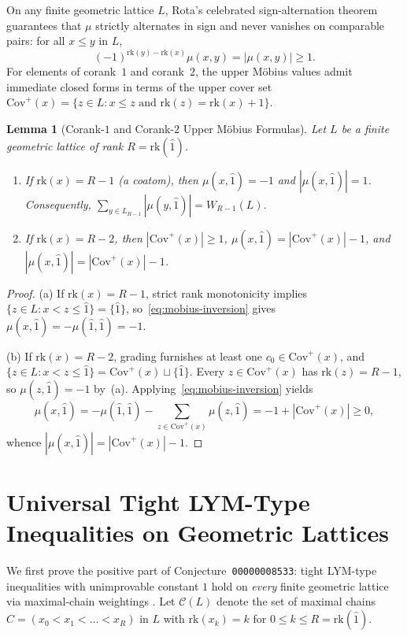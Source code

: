 \documentclass[11pt]{article}
\newtheorem{lemma}[theorem]{Lemma}
\theoremstyle{definition}
\theoremstyle{remark}
\newcommand{\rk}{\mathrm{rk}}
\newcommand{\Cov}{\mathrm{Cov}}
\begin{document}
On any finite geometric lattice $L$, Rota's celebrated sign-alternation theorem \cite[Theorem~4]{Rota1964} guarantees that $\mu$ strictly alternates in sign and never vanishes on comparable pairs: for all $x \le y$ in $L$,
\begin{equation}\label{eq:rota-sign}
  (-1)^{\rk(y) - \rk(x)} \mu(x, y) = |\mu(x, y)| \ge 1.
\end{equation}
For elements of corank~$1$ and corank~$2$, the upper M\"obius values admit immediate closed forms in terms of the upper cover set $\Cov^+(x) = \{z \in L : x \le z \text{ and } \rk(z) = \rk(x) + 1\}$.

\begin{lemma}[Corank-$1$ and Corank-$2$ Upper M\"obius Formulas]\label{lem:corank12}
Let $L$ be a finite geometric lattice of rank $R = \rk(\hat{1})$.
\begin{enumerate}
\item[(a)] If $\rk(x) = R - 1$ (a coatom), then $\mu(x, \hat{1}) = -1$ and $|\mu(x, \hat{1})| = 1$. Consequently, $\sum_{y \in L_{R-1}} |\mu(y, \hat{1})| = W_{R-1}(L)$.
\item[(b)] If $\rk(x) = R - 2$, then $|\Cov^+(x)| \ge 1$, $\mu(x, \hat{1}) = |\Cov^+(x)| - 1$, and $|\mu(x, \hat{1})| = |\Cov^+(x)| - 1$.
\end{enumerate}
\end{lemma}
\begin{proof}
(a) If $\rk(x) = R - 1$, strict rank monotonicity implies $\{z \in L : x < z \le \hat{1}\} = \{\hat{1}\}$, so~\eqref{eq:mobius-inversion} gives $\mu(x, \hat{1}) = -\mu(\hat{1}, \hat{1}) = -1$.

(b) If $\rk(x) = R - 2$, grading furnishes at least one $c_0 \in \Cov^+(x)$, and $\{z \in L : x < z \le \hat{1}\} = \Cov^+(x) \sqcup \{\hat{1}\}$. Every $z \in \Cov^+(x)$ has $\rk(z) = R - 1$, so $\mu(z, \hat{1}) = -1$ by~(a). Applying~\eqref{eq:mobius-inversion} yields
\[
  \mu(x, \hat{1}) = -\mu(\hat{1}, \hat{1}) - \sum_{z \in \Cov^+(x)} \mu(z, \hat{1}) = -1 + |\Cov^+(x)| \ge 0,
\]
whence $|\mu(x, \hat{1})| = |\Cov^+(x)| - 1$.
\end{proof}

\section{Universal Tight LYM-Type Inequalities on Geometric Lattices}

We first prove the positive part of Conjecture~\texttt{00000008533}: tight LYM-type inequalities with unimprovable constant $1$ hold on \emph{every} finite geometric lattice via maximal-chain weightings \cite{Harper1974,Kung1995,Lubell1966}. Let $\mathcal{C}(L)$ denote the set of maximal chains $C = (x_0 < x_1 < \dots < x_R)$ in $L$ with $\rk(x_k) = k$ for $0 \le k \le R = \rk(\hat{1})$.
\end{document}
